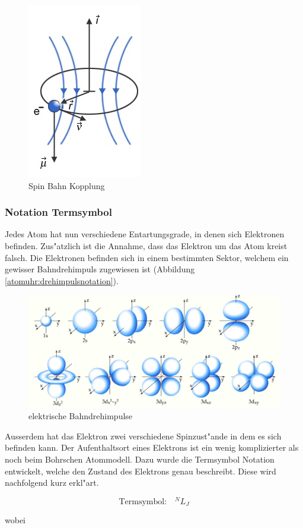 \begin{refsection}
\begin{figure}
	\centering
	\includegraphics[width=.2\columnwidth]{atomuhr/feinstrukturelektron.jpg}
	\caption{Spin Bahn Kopplung \cite{pic:feinstruktur}}
	\label{atomuhr:spinbahn}
\end{figure}

\subsubsection{Notation Termsymbol}
Jedes Atom hat nun verschiedene Entartungsgrade, in denen sich
Elektronen befinden. Zus"atzlich ist die Annahme, dass das Elektron um
das Atom kreist falsch. Die Elektronen befinden sich in einem
bestimmten Sektor, welchem ein gewisser Bahndrehimpuls zugewiesen ist (Abbildung \ref{atomuhr:drehimpulsnotation}).
\begin{figure}
	\centering
	\includegraphics[width = 0.8\columnwidth]{atomuhr/orbitale.JPG}
	\caption{elektrische Bahndrehimpulse \cite{pic:orbitale}}
	\label{atomuhr:bahndrehimpuls}
\end{figure}
Ausserdem hat das Elektron zwei verschiedene Spinzust"ande in dem es
sich befinden kann. Der Aufenthaltsort eines Elektrons ist ein wenig
komplizierter als noch beim Bohrschen Atommodell.  Dazu wurde die
Termsymbol Notation entwickelt, welche den Zustand des Elektrons genau
beschreibt.  Diese wird nachfolgend kurz erkl"art.

\begin{equation}
	\text{Termsymbol:} \quad ^NL _J
\end{equation}

wobei


\end{refsection}
